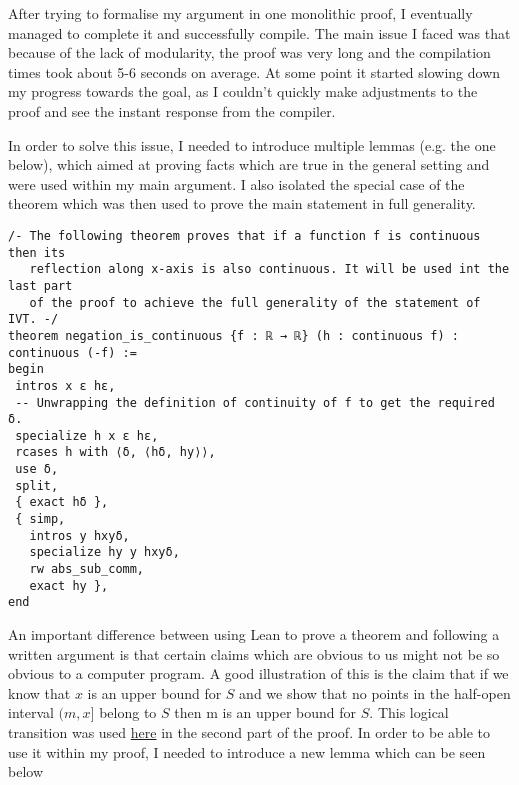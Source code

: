 \documentclass[11pt]{article}
\begin{document}
After trying to formalise my argument in one monolithic proof, I eventually
managed to complete it and successfully compile. The main issue I faced was
that because of the lack of modularity, the proof was very long and the
compilation times took about 5-6 seconds on average. At some point it
started slowing down my progress towards the goal, as I couldn't quickly make
adjustments to the proof and see the instant response from the compiler.

In order to solve this issue, I needed to introduce multiple lemmas (e.g. the one below), which
aimed at proving facts which are true in the general setting and were used within
my main argument. I also isolated the special case of the theorem which was then
used to prove the main statement in full generality.

\begin{verbatim}
/- The following theorem proves that if a function f is continuous then its
   reflection along x-axis is also continuous. It will be used int the last part
   of the proof to achieve the full generality of the statement of IVT. -/
theorem negation_is_continuous {f : ℝ → ℝ} (h : continuous f) : continuous (-f) :=
begin
 intros x ε hε,
 -- Unwrapping the definition of continuity of f to get the required δ.
 specialize h x ε hε,
 rcases h with ⟨δ, ⟨hδ, hy⟩⟩,
 use δ,
 split,
 { exact hδ },
 { simp,
   intros y hxyδ,
   specialize hy y hxyδ,
   rw abs_sub_comm,
   exact hy },
end
\end{verbatim}

An important difference between using Lean to prove a theorem and following a
written argument is that certain claims which are obvious to us might not be so
obvious to a computer program. A good illustration of this is the claim
that if we know that $x$ is an upper bound for $S$ and we show that no points
in the half-open interval $(m, x]$ belong to  $S$ then m is an upper bound for  $S$.
This logical transition was used \hyperlink{upper_bound}{here} in the
second part of the proof. In order to be able to use it within my proof, I
needed to introduce a new lemma which can be seen below

\pagebreak
\end{document}
